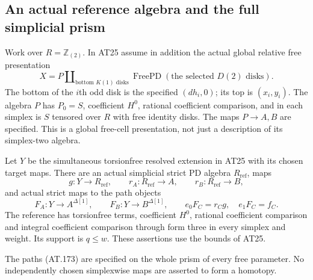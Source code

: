 \subsection{An actual reference algebra and the full simplicial prism}

\begin{theorem}
\label{AT26}
Work over $R=\mathbb Z_{(2)}$.
In AT25 assume in addition the actual global relative
free presentation
\[
 X=P\amalg_{\text{bottom }K(1)\text{ disks}}
          \operatorname{FreePD}(\text{the selected }D(2)\text{ disks}).
 \tag{AT.171}
\]
The bottom of the $i$th odd disk is the specified
$(dh_i,0)$; its top is $(x_i,y_i)$.
The algebra $P$ has $P_0=S$, coefficient $H^0$,
rational coefficient comparison, and in each simplex
is $S$ tensored over $R$ with free identity disks.
The maps $P\to A,B$ are specified.
This is a global free-cell presentation, not just
a description of its simplex-two algebra.

Let $Y$ be the simultaneous torsionfree resolved
extension in AT25 with its chosen target maps.
There are an actual simplicial strict PD algebra
$R_{\mathrm{ref}}$, maps
\[
 g:Y\longrightarrow R_{\mathrm{ref}},
 \qquad r_A:R_{\mathrm{ref}}\longrightarrow A,
 \qquad r_B:R_{\mathrm{ref}}\longrightarrow B,
 \tag{AT.172}
\]
and actual strict maps to the path objects
\[
 F_A:Y\longrightarrow A^{\Delta[1]},\qquad
 F_B:Y\longrightarrow B^{\Delta[1]},
 \qquad e_0F_C=r_Cg,\quad e_1F_C=f_C .
 \tag{AT.173}
\]
The reference has torsionfree terms, coefficient
$H^0$, rational coefficient comparison and integral
coefficient comparison through form three in every
simplex and weight.
Its support is $q\leq w$.
These assertions use the bounds of AT25.

The paths (AT.173) are specified on the whole
prism of every free parameter. No independently
chosen simplexwise maps are asserted to form a
homotopy.
\end{theorem}

